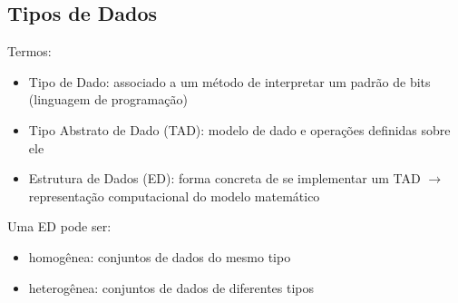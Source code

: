 \subsection{Tipos de Dados}
\begin{frame}[label=notas]
	Termos:
	\begin{itemize}
		\item Tipo de Dado: associado a um método de interpretar um padrão de bits (linguagem de programação)
		\item Tipo Abstrato de Dado (TAD): modelo de dado e operações definidas sobre ele %
		\item Estrutura de Dados (ED): forma concreta de se implementar um TAD \pause $\rightarrow$ \alert<2>{representação computacional do modelo matemático}
	\end{itemize}
	\pause\vfill
	Uma ED pode ser:
	\begin{itemize}
		\item homogênea: conjuntos de dados do mesmo tipo
		\item heterogênea: conjuntos de dados de diferentes tipos
	\end{itemize}
\end{frame}

